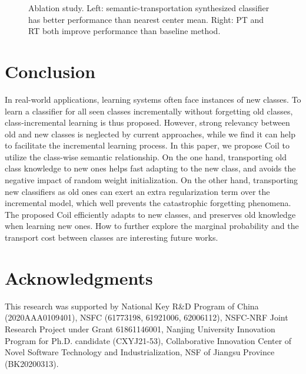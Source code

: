 \documentclass[sigconf]{acmart}
\newcommand{\name}{{\sc Coil }}
\begin{document}
\begin{figure}[t]
	\begin{center}
	\end{center}
	\vspace{-3mm}
	\caption{\small Ablation study. Left: semantic-transportation synthesized classifier has better performance than nearest center mean.
		Right:	PT and RT both improve performance than baseline method.} \label{figure:abalation}
	\vspace{-3mm}
\end{figure}


\section{Conclusion}


In real-world applications, learning systems often face instances of new classes. To learn a classifier for all seen classes incrementally without forgetting old classes, class-incremental learning is thus proposed. However, strong relevancy between old and new classes is neglected by current approaches, while we find it can help to facilitate the incremental learning process.
In this paper, we propose \name to utilize the class-wise semantic relationship. On the one hand, 
transporting old class knowledge to new ones helps fast adapting to the new class, and avoids the negative impact of random weight initialization.  
On the other hand, transporting new classifiers as old ones can exert an extra regularization term over the incremental model, which well prevents the catastrophic forgetting phenomena.
The proposed \name efficiently adapts to new classes, and preserves old knowledge when learning new ones. 
How to further explore the marginal probability  and the transport cost between classes are interesting future works.


\section*{Acknowledgments}

This research was supported by National Key
R\&D Program of China (2020AAA0109401), NSFC (61773198, 61921006, 62006112), NSFC-NRF Joint Research Project under Grant 61861146001, Nanjing University Innovation Program for
Ph.D. candidate (CXYJ21-53), Collaborative Innovation Center of Novel Software Technology and Industrialization, NSF of Jiangsu Province (BK20200313).


	
\balance

\end{document}

